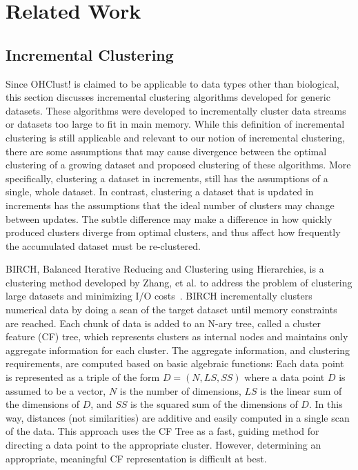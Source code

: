 \documentclass[12pt]{ucthesis}
\begin{document}
\chapter{Related Work}\label{chap:related}

   \section{Incremental Clustering}\label{sec:incr_cluster}
   Since OHClust! is claimed to be applicable to data types other than
   biological, this section discusses incremental clustering algorithms
   developed for generic datasets. These algorithms were developed to
   incrementally cluster data streams or datasets too large to fit in main
   memory. While this definition of incremental clustering is still applicable
   and relevant to our notion of incremental clustering, there are some
   assumptions that may cause divergence between the optimal clustering of a
   growing dataset and proposed clustering of these algorithms. More
   specifically, clustering a dataset in increments, still has the assumptions
   of a single, whole dataset. In contrast, clustering a dataset that is
   updated in increments has the assumptions that the ideal number of clusters
   may change between updates. The subtle difference may make a difference in
   how quickly produced clusters diverge from optimal clusters, and thus affect
   how frequently the accumulated dataset must be re-clustered.

   BIRCH, Balanced Iterative Reducing and Clustering using Hierarchies, is a
   clustering method developed by Zhang, et al. to address the problem of
   clustering large datasets and minimizing I/O costs~\cite{Zhang:BIRCH}. BIRCH
   incrementally clusters numerical data by doing a scan of the target dataset
   until memory constraints are reached. Each chunk of data is added to an
   N-ary tree, called a cluster feature (CF) tree, which represents clusters as
   internal nodes and maintains only aggregate information for each cluster.
   The aggregate information, and clustering requirements, are computed based
   on basic algebraic functions: Each data point is represented as a triple of
   the form $D = (N, LS, SS)$ where a data point $D$ is assumed to be a vector,
   $N$ is the number of dimensions, $LS$ is the linear sum of the dimensions of
   $D$, and $SS$ is the squared sum of the dimensions of $D$. In this way,
   distances (not similarities) are additive and easily computed in a single
   scan of the data. This approach uses the CF Tree as a fast, guiding method
   for directing a data point to the appropriate cluster. However, determining
   an appropriate, meaningful CF representation is difficult at best.
\end{document}
